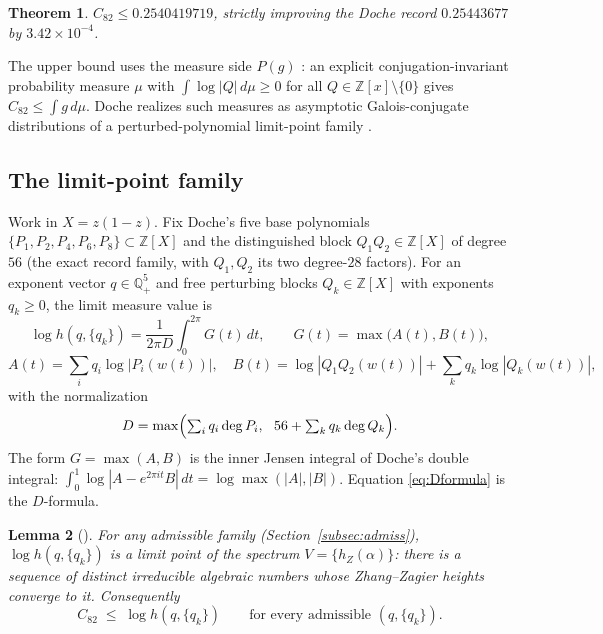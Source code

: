 \documentclass[11pt,reqno]{amsart}
\theoremstyle{plain}
\newtheorem{theorem}{Theorem}
\newtheorem{lemma}[theorem]{Lemma}
\theoremstyle{definition}
\newcommand{\Q}{\mathbb{Q}}
\newcommand{\Z}{\mathbb{Z}}
\newcommand{\hZ}{h_Z}
\newcommand{\Cee}{C_{82}}
\begin{document}
\begin{theorem}\label{thm:upper}
$\Cee\le 0.2540419719$, strictly improving the Doche record $0.25443677$ by
$3.42\times10^{-4}$.
\end{theorem}

The upper bound uses the measure side $P(g)$ \citep[Thm.~6.5]{BMQS}: an explicit
conjugation-invariant probability measure $\mu$ with $\int\log|Q|\,d\mu\ge0$ for
all $Q\in\Z[x]\setminus\{0\}$ gives $\Cee\le\int g\,d\mu$. Doche realizes such
measures as asymptotic Galois-conjugate distributions of a perturbed-polynomial
limit-point family \citep{Doc01a,Doc01b}.

\subsection{The limit-point family}
Work in $X=z(1-z)$. Fix Doche's five base polynomials
$\{P_1,P_2,P_4,P_6,P_8\}\subset\Z[X]$ and the distinguished block
$Q_1Q_2\in\Z[X]$ of degree $56$ (the exact \citep{Doc01b} record family, with
$Q_1,Q_2$ its two degree-$28$ factors). For an exponent vector $q\in\Q_+^5$ and
free perturbing blocks $Q_k\in\Z[X]$ with exponents $q_k\ge0$, the limit measure
value is
\begin{equation}\label{eq:logh}
  \log h(q,\{q_k\})=\frac1{2\pi D}\int_0^{2\pi}G(t)\,dt,\qquad
  G(t)=\max\bigl(A(t),B(t)\bigr),
\end{equation}
\[
  A(t)=\sum_i q_i\log|P_i(w(t))|,\quad
  B(t)=\log|Q_1Q_2(w(t))|+\sum_k q_k\log|Q_k(w(t))|,
\]
with the normalization
\begin{equation}\label{eq:Dformula}
  D=\max\Bigl(\textstyle\sum_i q_i\deg P_i,\ \ 56+\sum_k q_k\deg Q_k\Bigr).
\end{equation}
The form $G=\max(A,B)$ is the inner Jensen integral of Doche's double integral:
$\int_0^1\log|A-e^{2\pi it}B|\,dt=\log\max(|A|,|B|)$. Equation \eqref{eq:Dformula}
is the \citep[\S4]{Doc01a} $D$-formula.

\begin{lemma}[{\citep[Lemmas 2--5]{Doc01a}}]\label{lem:doche}
For any admissible family (Section~\ref{subsec:admiss}), $\log h(q,\{q_k\})$ is a
limit point of the spectrum $V=\{\hZ(\alpha)\}$: there is a sequence of distinct
irreducible algebraic numbers whose Zhang--Zagier heights converge to it.
Consequently
\begin{equation}\label{eq:upperbound}
  \Cee\;\le\;\log h(q,\{q_k\})\qquad\text{for every admissible }(q,\{q_k\}).
\end{equation}
\end{lemma}
\end{document}
